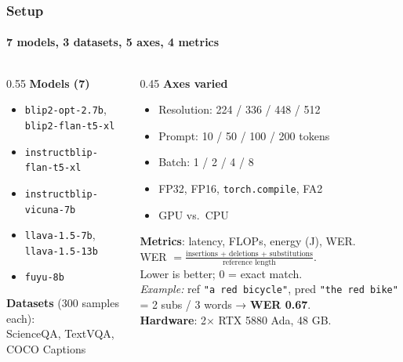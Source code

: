 \documentclass[
	11pt,
	aspectratio=169,
]{beamer}
\begin{document}
\begin{frame}
	\frametitle{Setup}
	\framesubtitle{7 models, 3 datasets, 5 axes, 4 metrics}

	\footnotesize
	\begin{columns}[t]
		\begin{column}{0.55\textwidth}
			\textbf{Models (7)}
			\begin{itemize}\setlength\itemsep{0pt}
				\item \texttt{blip2-opt-2.7b}, \texttt{blip2-flan-t5-xl}
				\item \texttt{instructblip-flan-t5-xl}
				\item \texttt{instructblip-vicuna-7b}
				\item \texttt{llava-1.5-7b}, \texttt{llava-1.5-13b}
				\item \texttt{fuyu-8b}
			\end{itemize}
			\smallskip
			\textbf{Datasets} (300 samples each):\\
			ScienceQA, TextVQA, COCO Captions
		\end{column}
		\begin{column}{0.45\textwidth}
			\textbf{Axes varied}
			\begin{itemize}\setlength\itemsep{0pt}
				\item Resolution: 224 / 336 / 448 / 512
				\item Prompt: 10 / 50 / 100 / 200 tokens
				\item Batch: 1 / 2 / 4 / 8
				\item FP32, FP16, \texttt{torch.compile}, FA2
				\item GPU vs.\ CPU
			\end{itemize}
			\smallskip
			\textbf{Metrics}: latency, FLOPs, energy (J), WER.\\
			{\scriptsize WER $= \frac{\text{insertions + deletions + substitutions}}{\text{reference length}}$.\\
			Lower is better; 0 = exact match.\\
			\textit{Example:} ref \texttt{"a red bicycle"}, pred \texttt{"the red bike"} = 2 subs / 3 words → \textbf{WER 0.67}.}\\
			\textbf{Hardware}: 2× RTX 5880 Ada, 48 GB.
		\end{column}
	\end{columns}
\end{frame}

\end{document}
